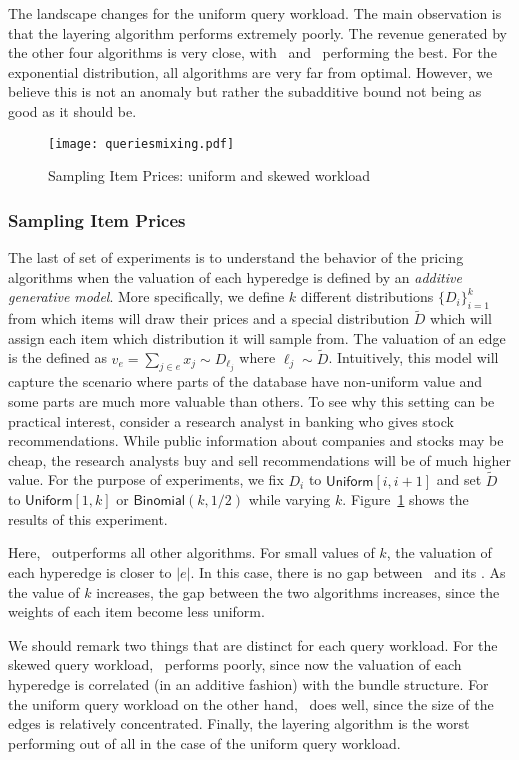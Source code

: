 The landscape changes for the uniform query workload. The main observation is that the layering
algorithm performs extremely poorly. The revenue generated by the other four algorithms is very
close, with \lpip\ and \ubp\ performing the best.  
For the exponential distribution, all algorithms are very far from optimal. However, we believe this is not an anomaly but rather the subadditive bound not being as good as it should be.


\begin{figure}[!t]
	\centering
	\texttt{[image: queriesmixing.pdf]}
	\caption{Sampling Item Prices: uniform and skewed workload} \label{fig:mixing}
\end{figure}  

\subsubsection{Sampling Item Prices} The last of set of experiments is to understand the behavior of the pricing algorithms when the valuation of each hyperedge is defined by an \emph{additive generative model}. More specifically, we define $k$ different distributions $\{D_i\}_{i=1}^{k}$ from which items will draw their prices and a special distribution $\tilde{D}$ which will assign each item which distribution it will sample from. The valuation of an edge is the defined as $v_e = \sum_{j \in e} x_j \sim D_{\ell_j}$ where $\ell_j \sim \tilde{D}$. Intuitively, this model will capture the scenario where parts of the database have non-uniform value and some parts are much more valuable than others. To see why this setting can be practical interest, consider a research analyst in banking who gives stock recommendations. While public information about companies and stocks may be cheap, the research analysts buy and sell recommendations will be of much higher value. For the purpose of experiments, we fix $D_i$ to $\textsf{Uniform}[i, i+1]$ and set $\tilde{D}$ to $\textsf{Uniform}[1, k]$ or $\textsf{Binomial}(k, 1/2)$ while varying $k$. Figure~\ref{fig:mixing} shows the results of this experiment. 

Here, \lpip\ outperforms all other algorithms. For small values of $k$, the valuation of each hyperedge is closer to $|e|$. In this case, there is no gap between \uip\ and its \lpip. As the value of $k$ increases, the gap between the two algorithms increases, since the weights of each item become less uniform.
 
We should remark two things that are distinct for each query workload. For the skewed query workload, \ubp\ performs poorly, since now the valuation of each hyperedge is correlated (in an additive fashion) with the bundle structure. For the uniform query workload on the other hand, \ubp\ does well, since   
the size of the edges is relatively concentrated. Finally, the layering algorithm is the worst performing out of all in the case of the uniform query workload.

